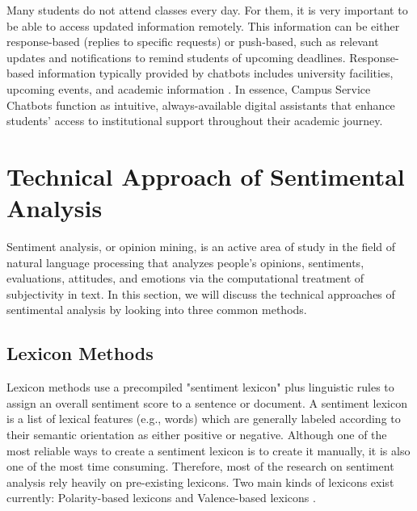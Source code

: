 \documentclass{xum_review}
\begin{document}
Many students do not attend classes every day. For them, it is very important to
be able to access updated information remotely. This information can be either
response-based (replies to specific requests) or push-based, such as relevant
updates and notifications to remind students of upcoming deadlines.
Response-based information typically provided by chatbots includes university
facilities, upcoming events, and academic information \citep{ranoliya2017chatbot}.
In essence, Campus Service Chatbots function as intuitive, always-available
digital assistants that enhance students' access to institutional support
throughout their academic journey.

\section{Technical Approach of Sentimental Analysis}
Sentiment analysis, or opinion mining, is an active area of study in the field
of natural language processing that analyzes people's opinions, sentiments,
evaluations, attitudes, and emotions via the computational treatment of
subjectivity in text. In this section, we will discuss the technical approaches
of sentimental analysis by looking into three common methods.

\subsection{Lexicon Methods}

Lexicon methods use a precompiled "sentiment lexicon" plus linguistic rules to
assign an overall sentiment score to a sentence or document. A sentiment lexicon
is a list of lexical features (e.g., words) which are generally labeled
according to their semantic orientation as either positive or negative. Although
one of the most reliable ways to create a sentiment lexicon is to create it
manually, it is also one of the most time consuming. Therefore, most of the
research on sentiment analysis rely heavily on pre-existing lexicons. Two main
kinds of lexicons exist currently: Polarity-based lexicons  and Valence-based
lexicons \citep{hutto2014vader}.
\end{document}
